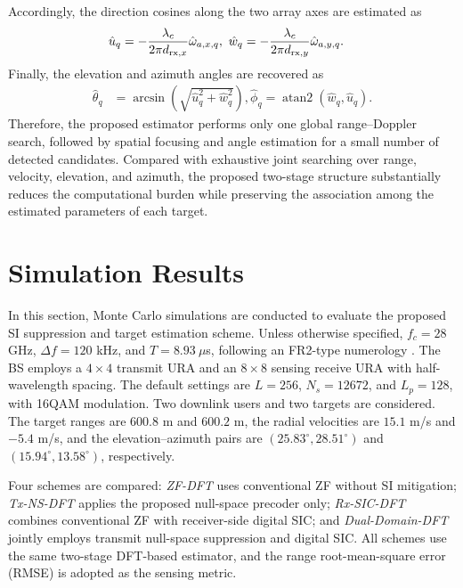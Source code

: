 \documentclass[conference]{IEEEtran}
\begin{document}
Accordingly, the direction cosines along the two array axes are estimated as \begin{align} 
\hat u_q &= -\frac{\lambda_c} {2\pi d_{{\rm rx},x}} \hat{\omega}_{a,x,q}, ~
\hat w_q = -\frac{\lambda_c} {2\pi d_{{\rm rx},y}} \hat{\omega}_{a,y,q}. \label{eq:w_est} \end{align} 
Finally, the elevation and azimuth angles are recovered as 
\begin{align} 
\hat{\theta}_q &= \arcsin \left( \sqrt{\hat u_q^2+\hat w_q^2} \right), 
\hat{\phi}_q = \operatorname{atan2} \left( \hat w_q,\hat u_q \right). \label{eq:azimuth_est} 
\end{align}
Therefore, the proposed estimator performs only one global range--Doppler search, followed by spatial focusing and angle estimation for a small number of detected candidates. Compared with exhaustive joint searching over range, velocity, elevation, and azimuth, the proposed two-stage structure substantially reduces the computational burden while preserving the association among the estimated parameters of each target. 


\section{Simulation Results}
\label{sec:simulation}
In this section, Monte Carlo simulations are conducted to evaluate the proposed SI suppression and target estimation scheme. Unless otherwise specified, $f_c=28$ GHz, $\Delta f=120$ kHz, and $T=8.93~\mu$s, following an FR2-type numerology \cite{3gpp38104}. The BS employs a $4\times4$ transmit URA and an $8\times8$ sensing receive URA with half-wavelength spacing. The default settings are $L=256$, $N_s=12672$, and $L_p=128$, with 16QAM modulation. Two downlink users and two targets are considered. The target ranges are $600.8$ m and $600.2$ m, the radial velocities are $15.1$ m/s and $-5.4$ m/s, and the elevation--azimuth pairs are $(25.83^\circ,28.51^\circ)$ and $(15.94^\circ,13.58^\circ)$, respectively.

Four schemes are compared: \emph{ZF-DFT} uses conventional ZF without SI mitigation; \emph{Tx-NS-DFT} applies the proposed null-space precoder only; \emph{Rx-SIC-DFT} combines conventional ZF with receiver-side digital SIC; and \emph{Dual-Domain-DFT} jointly employs transmit null-space suppression and digital SIC. All schemes use the same two-stage DFT-based estimator, and the range root-mean-square error (RMSE) is adopted as the sensing metric.
\end{document}
